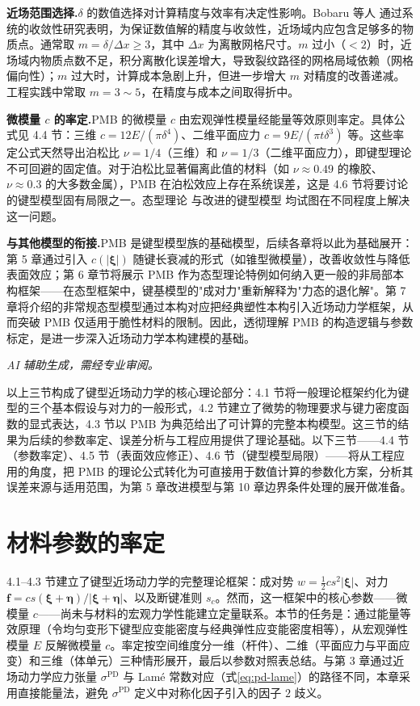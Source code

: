 \textbf{近场范围选择.}$\delta$ 的数值选择对计算精度与效率有决定性影响。Bobaru 等人 \cite{Bobaru2009} 通过系统的收敛性研究表明，为保证数值解的精度与收敛性，近场域内应包含足够多的物质点。通常取 $m=\delta/\Delta x\geq 3$，其中 $\Delta x$ 为离散网格尺寸。$m$ 过小（$<2$）时，近场域内物质点数不足，积分离散化误差增大，导致裂纹路径的网格局域依赖（网格偏向性）；$m$ 过大时，计算成本急剧上升，但进一步增大 $m$ 对精度的改善递减。工程实践中常取 $m=3\sim5$，在精度与成本之间取得折中。

\textbf{微模量 $c$ 的率定.}PMB 的微模量 $c$ 由宏观弹性模量经能量等效原则率定。具体公式见 4.4 节：三维 $c=12E/(\pi\delta^{4})$、二维平面应力 $c=9E/(\pi t\delta^{3})$ 等。这些率定公式天然导出泊松比 $\nu=1/4$（三维）和 $\nu=1/3$（二维平面应力），即键型理论不可回避的固定值。对于泊松比显著偏离此值的材料（如 $\nu\approx 0.49$ 的橡胶、$\nu\approx 0.3$ 的大多数金属），PMB 在泊松效应上存在系统误差，这是 4.6 节将要讨论的键型模型固有局限之一。态型理论 \cite{Silling2007} 与改进的键型模型 \cite{TrageserSeleson2020} 均试图在不同程度上解决这一问题。

\textbf{与其他模型的衔接.}PMB 是键型模型族的基础模型，后续各章将以此为基础展开：第 5 章通过引入 $c(|\boldsymbol{\xi}|)$ 随键长衰减的形式（如锥型微模量），改善收敛性与降低表面效应；第 6 章节将展示 PMB 作为态型理论特例如何纳入更一般的非局部本构框架——在态型框架中，键基模型的"成对力"重新解释为"力态的退化解"。第 7 章将介绍的非常规态型模型通过本构对应把经典塑性本构引入近场动力学框架，从而突破 PMB 仅适用于脆性材料的限制。因此，透彻理解 PMB 的构造逻辑与参数标定，是进一步深入近场动力学本构建模的基础。

\emph{AI 辅助生成，需经专业审阅。}

以上三节构成了键型近场动力学的核心理论部分：4.1 节将一般理论框架约化为键型的三个基本假设与对力的一般形式，4.2 节建立了微势的物理要求与键力密度函数的显式表达，4.3 节以 PMB 为典范给出了可计算的完整本构模型。这三节的结果为后续的参数率定、误差分析与工程应用提供了理论基础。以下三节——4.4 节（参数率定）、4.5 节（表面效应修正）、4.6 节（键型模型局限）——将从工程应用的角度，把 PMB 的理论公式转化为可直接用于数值计算的参数化方案，分析其误差来源与适用范围，为第 5 章改进模型与第 10 章边界条件处理的展开做准备。

\section{材料参数的率定}

4.1--4.3 节建立了键型近场动力学的完整理论框架：成对势 $w=\tfrac{1}{2}c s^{2}|\boldsymbol{\xi}|$、对力 $\mathbf{f}=c s(\boldsymbol{\xi}+\boldsymbol{\eta})/|\boldsymbol{\xi}+\boldsymbol{\eta}|$、以及断键准则 $s_c$。然而，这一框架中的核心参数——微模量 $c$——尚未与材料的宏观力学性能建立定量联系。本节的任务是：通过能量等效原理（令均匀变形下键型应变能密度与经典弹性应变能密度相等），从宏观弹性模量 $E$ 反解微模量 $c$。率定按空间维度分一维（杆件）、二维（平面应力与平面应变）和三维（体单元）三种情形展开，最后以参数对照表总结。与第 3 章通过近场动力学应力张量 $\sigma^{\mathrm{PD}}$ 与 Lam\'e 常数对应（式\eqref{eq:pd-lame}）的路径不同，本章采用直接能量法，避免 $\sigma^{\mathrm{PD}}$ 定义中对称化因子引入的因子 $2$ 歧义。

